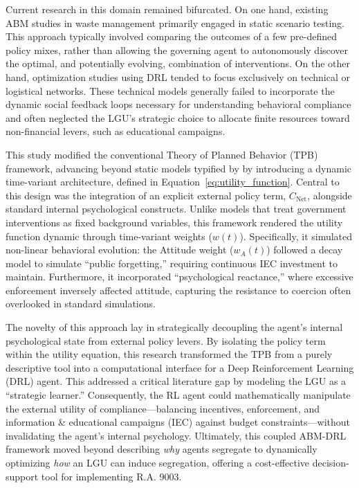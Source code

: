 Current research in this domain remained bifurcated. On one hand, existing ABM studies in waste management primarily engaged in static scenario testing. This approach typically involved comparing the outcomes of a few pre-defined policy mixes, rather than allowing the governing agent to autonomously discover the optimal, and potentially evolving, combination of interventions. On the other hand, optimization studies using DRL tended to focus exclusively on technical or logistical networks. These technical models generally failed to incorporate the dynamic social feedback loops necessary for understanding behavioral compliance and often neglected the LGU's strategic choice to allocate finite resources toward non-financial levers, such as educational campaigns.

This study modified the conventional Theory of Planned Behavior (TPB) framework, advancing beyond static models typified by \citet{Ceschi2021} by introducing a dynamic time-variant architecture, defined in Equation~\ref{eq:utility_function}. Central to this design was the integration of an explicit external policy term, $C_{\mathrm{Net}}$, alongside standard internal psychological constructs. Unlike models that treat government interventions as fixed background variables, this framework rendered the utility function dynamic through time-variant weights ($w(t)$). Specifically, it simulated non-linear behavioral evolution: the Attitude weight ($w_A(t)$) followed a decay model to simulate ``public forgetting,'' requiring continuous IEC investment to maintain. Furthermore, it incorporated ``psychological reactance,'' where excessive enforcement inversely affected attitude, capturing the resistance to coercion often overlooked in standard simulations.

The novelty of this approach lay in strategically decoupling the agent's internal psychological state from external policy levers. By isolating the policy term within the utility equation, this research transformed the TPB from a purely descriptive tool into a computational interface for a Deep Reinforcement Learning (DRL) agent. This addressed a critical literature gap by modeling the LGU as a ``strategic learner.'' Consequently, the RL agent could mathematically manipulate the external utility of compliance---balancing incentives, enforcement, and information \& educational campaigns (IEC) against budget constraints---without invalidating the agent's internal psychology. Ultimately, this coupled ABM-DRL framework moved beyond describing \textit{why} agents segregate to dynamically optimizing \textit{how} an LGU can induce segregation, offering a cost-effective decision-support tool for implementing R.A. 9003.